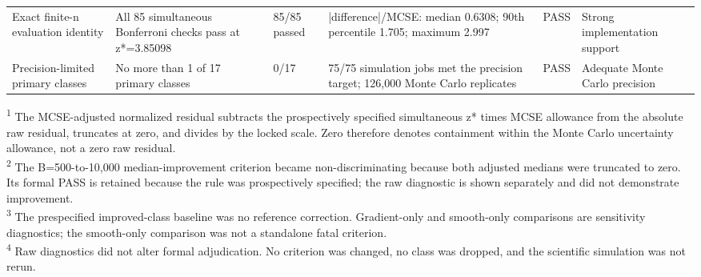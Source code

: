 \begin{table}[htbp]
\begin{tabularx}{\textwidth}{p{} p{} p{} p{} p{} X}
Exact finite-n evaluation identity & All 85 simultaneous Bonferroni checks pass at z*=3.85098 & 85/85 passed & |difference|/MCSE: median 0.6308; 90th percentile 1.705; maximum 2.997 & PASS & Strong implementation support \\
Precision-limited primary classes & No more than 1 of 17 primary classes & 0/17 & 75/75 simulation jobs met the precision target; 126,000 Monte Carlo replicates & PASS & Adequate Monte Carlo precision \\
\bottomrule
\end{tabularx}
\begin{minipage}{\textwidth}
\footnotesize
\textsuperscript{1} The MCSE-adjusted normalized residual subtracts the prospectively specified simultaneous z* times MCSE allowance from the absolute raw residual, truncates at zero, and divides by the locked scale. Zero therefore denotes containment within the Monte Carlo uncertainty allowance, not a zero raw residual.\\
\textsuperscript{2} The B=500-to-10,000 median-improvement criterion became non-discriminating because both adjusted medians were truncated to zero. Its formal PASS is retained because the rule was prospectively specified; the raw diagnostic is shown separately and did not demonstrate improvement.\\
\textsuperscript{3} The prespecified improved-class baseline was no reference correction. Gradient-only and smooth-only comparisons are sensitivity diagnostics; the smooth-only comparison was not a standalone fatal criterion.\\
\textsuperscript{4} Raw diagnostics did not alter formal adjudication. No criterion was changed, no class was dropped, and the scientific simulation was not rerun.\\
\end{minipage}
\end{table}
